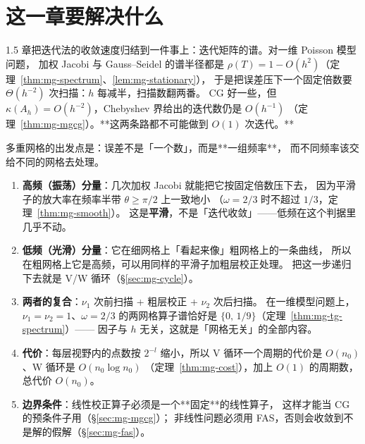 

\section{这一章要解决什么}

1.5 章把迭代法的收敛速度归结到一件事上：迭代矩阵的谱。对一维 Poisson 模型问题，
加权 Jacobi 与 Gauss--Seidel 的谱半径都是
$\rho(T)=1-O(h^2)$（定理~\ref{thm:mg-spectrum}、\ref{lem:mg-stationary}），
于是把误差压下一个固定倍数要 $\Theta(h^{-2})$ 次扫描：$h$ 每减半，扫描数翻两番。
CG 好一些，但 $\kappa(A_h)=O(h^{-2})$，Chebyshev 界给出的迭代数仍是 $O(h^{-1})$
（定理~\ref{thm:mg-mgcg}）。**这两条路都不可能做到 $O(1)$ 次迭代。**

多重网格的出发点是：误差不是「一个数」，而是**一组频率**，
而不同频率该交给不同的网格去处理。

\begin{enumerate}
  \item \textbf{高频（振荡）分量}：几次加权 Jacobi 就能把它按固定倍数压下去，
        因为平滑子的放大率在频率半带 $\theta\ge\pi/2$ 上一致地小
        （$\omega=2/3$ 时不超过 $1/3$，定理~\ref{thm:mg-smooth}）。
        这是\textbf{平滑}，不是「迭代收敛」——低频在这个判据里几乎不动。
  \item \textbf{低频（光滑）分量}：它在细网格上「看起来像」粗网格上的一条曲线，
        所以在粗网格上它是高频，可以用同样的平滑子加粗层校正处理。
        把这一步递归下去就是 V/W 循环（\S\ref{sec:mg-cycle}）。
  \item \textbf{两者的复合}：$\nu_1$ 次前扫描 + 粗层校正 + $\nu_2$ 次后扫描。
        在一维模型问题上，$\nu_1=\nu_2=1$、$\omega=2/3$ 的两网格算子谱恰好是
        $\{0,\,1/9\}$（定理~\ref{thm:mg-tg-spectrum}）——
        因子与 $h$ 无关，这就是「网格无关」的全部内容。
  \item \textbf{代价}：每层视野内的点数按 $2^{-l}$ 缩小，所以
        V 循环一个周期的代价是 $O(n_0)$、W 循环是 $O(n_0\log n_0)$
        （定理~\ref{thm:mg-cost}），加上 $O(1)$ 的周期数，总代价 $O(n_0)$。
  \item \textbf{边界条件}：线性校正算子必须是一个**固定**的线性算子，
        这样才能当 CG 的预条件子用（\S\ref{sec:mg-mgcg}）；
        非线性问题必须用 FAS，否则会收敛到不是解的假解（\S\ref{sec:mg-fas}）。
\end{enumerate}

